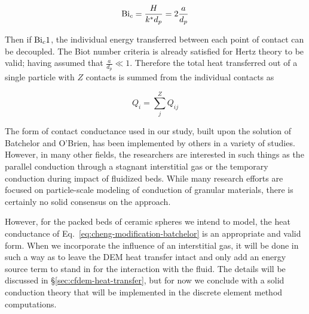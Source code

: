 \begin{equation}
	\mathrm{Bi}_c = \frac{H}{k^* d_p} = 2\frac{a}{d_p}
\end{equation}

Then if $\mathrm{Bi}_c \\ 1$, the individual energy transferred between each point of contact can be decoupled. The Biot number criteria is already satisfied for Hertz theory to be valid; having assumed that $\frac{a}{d_p} \ll 1$. Therefore the total heat transferred out of a single particle with $Z$ contacts is summed from the individual contacts as 

\begin{equation}
	Q_i = \sum_j^Z Q_{ij}
\end{equation}

The form of contact conductance used in our study, built upon the solution of Batchelor and O'Brien\cite{Batchelor1977}, has been implemented by others in a variety of studies\cite{Vargas2001, Chaudhuri2006, Zhou2009,Cheng19994199}. However, in many other fields, the researchers are interested in such things as the parallel conduction through a stagnant interstitial gas\cite{Bu2013} or the temporary conduction during impact of fluidized beds\cite{Zhu2008,Zhang2011,Wu2011,Li2000}. While many research efforts are focused on particle-scale modeling of conduction of granular materials, there is certainly no solid consensus on the approach. 

However, for the packed beds of ceramic spheres we intend to model, the heat conductance of Eq.~\ref{eq:cheng-modification-batchelor} is an appropriate and valid form. When we incorporate the influence of an interstitial gas, it will be done in such a way as to leave the DEM heat transfer intact and only add an energy source term to stand in for the interaction with the fluid. The details will be discussed in \S\ref{sec:cfdem-heat-transfer}, but for now we conclude with a solid conduction theory that will be implemented in the discrete element method computations.